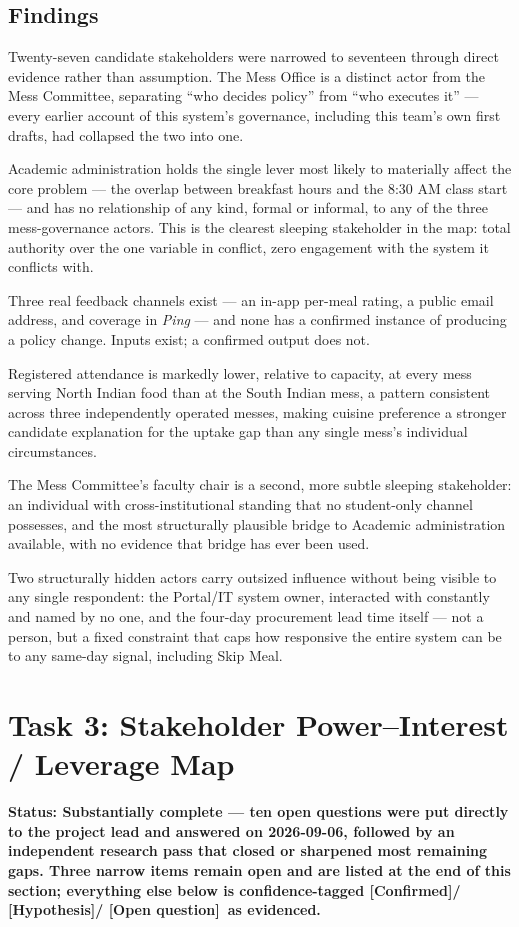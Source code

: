 \documentclass[11pt]{article}
\newcommand{\status}[1]{\noindent\textbf{Status: #1}\par\vspace{4pt}}
\newcommand{\confirmed}{\textbf{[Confirmed]}}
\newcommand{\hypo}{\textbf{[Hypothesis]}}
\newcommand{\openq}{\textbf{[Open question]}}
\begin{document}
\subsection{Findings}

Twenty-seven candidate stakeholders were narrowed to seventeen through direct
evidence rather than assumption. The Mess Office is a distinct actor from the Mess
Committee, separating ``who decides policy'' from ``who executes it'' --- every
earlier account of this system's governance, including this team's own first drafts,
had collapsed the two into one.

Academic administration holds the single lever most likely to materially affect the
core problem --- the overlap between breakfast hours and the 8:30 AM class start ---
and has no relationship of any kind, formal or informal, to any of the three
mess-governance actors. This is the clearest sleeping stakeholder in the map: total
authority over the one variable in conflict, zero engagement with the system it
conflicts with.

Three real feedback channels exist --- an in-app per-meal rating, a public email
address, and coverage in \emph{Ping} --- and none has a confirmed instance of
producing a policy change. Inputs exist; a confirmed output does not.

Registered attendance is markedly lower, relative to capacity, at every mess serving
North Indian food than at the South Indian mess, a pattern consistent across three
independently operated messes, making cuisine preference a stronger candidate
explanation for the uptake gap than any single mess's individual circumstances.

The Mess Committee's faculty chair is a second, more subtle sleeping stakeholder: an
individual with cross-institutional standing that no student-only channel possesses,
and the most structurally plausible bridge to Academic administration available, with
no evidence that bridge has ever been used.

Two structurally hidden actors carry outsized influence without being visible to any
single respondent: the Portal/IT system owner, interacted with constantly and named
by no one, and the four-day procurement lead time itself --- not a person, but a
fixed constraint that caps how responsive the entire system can be to any same-day
signal, including Skip Meal.

\newpage

\section{Task 3: Stakeholder Power--Interest / Leverage Map}
\status{Substantially complete --- ten open questions were put directly to the project
lead and answered on 2026-09-06, followed by an independent research pass that closed
or sharpened most remaining gaps. Three narrow items remain open and are listed at the
end of this section; everything else below is confidence-tagged \confirmed / \hypo /
\openq\ as evidenced.}
\end{document}
